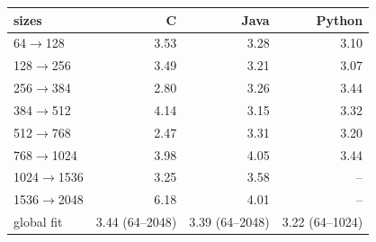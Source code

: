 \begin{tabular}{lrrr}
\toprule
sizes & C & Java & Python \\
\midrule
64$\to$128 & 3.53 & 3.28 & 3.10 \\
128$\to$256 & 3.49 & 3.21 & 3.07 \\
256$\to$384 & 2.80 & 3.26 & 3.44 \\
384$\to$512 & 4.14 & 3.15 & 3.32 \\
512$\to$768 & 2.47 & 3.31 & 3.20 \\
768$\to$1024 & 3.98 & 4.05 & 3.44 \\
1024$\to$1536 & 3.25 & 3.58 & -- \\
1536$\to$2048 & 6.18 & 4.01 & -- \\
\midrule global fit & 3.44 (64--2048) & 3.39 (64--2048) & 3.22 (64--1024) \\
\bottomrule
\end{tabular}
